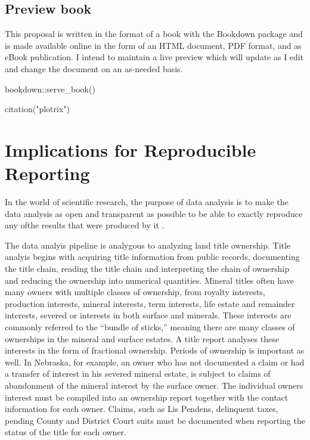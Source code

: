 \documentclass[
]{book}
\newenvironment{Shaded}{\begin{snugshade}}{\end{snugshade}}
\newcommand{\FunctionTok}[1]{\textcolor[rgb]{0.00,0.00,0.00}{#1}}
\newcommand{\NormalTok}[1]{#1}
\newcommand{\SpecialCharTok}[1]{\textcolor[rgb]{0.00,0.00,0.00}{#1}}
\newcommand{\StringTok}[1]{\textcolor[rgb]{0.31,0.60,0.02}{#1}}
\theoremstyle{definition}
\theoremstyle{definition}
\theoremstyle{definition}
\theoremstyle{definition}
\theoremstyle{remark}
\begin{document}
\hypertarget{preview-book}{%
\section{Preview book}\label{preview-book}}

This proposal is written in the format of a book with the Bookdown package and is made available online in the form of an HTML document, PDF format, and as eBook publication. I intend to maintain a live preview which will update as I edit and change the document on an as-needed basis.

\begin{Shaded}
\begin{Highlighting}[]
\NormalTok{bookdown}\SpecialCharTok{::}\FunctionTok{serve\_book}\NormalTok{()}
\end{Highlighting}
\end{Shaded}

\begin{Shaded}
\begin{Highlighting}[]
\FunctionTok{citation}\NormalTok{(}\StringTok{"plotrix"}\NormalTok{)}
\end{Highlighting}
\end{Shaded}

\hypertarget{implications-for-reproducible-reporting}{%
\chapter{Implications for Reproducible Reporting}\label{implications-for-reproducible-reporting}}

In the world of scientific research, the purpose of data analysis is to make the data analysis as open and transparent as possible to be able to exactly reproduce any ofthe results that were produced by it \citep{andrewsChapterReproducibleData}.

The data analyis pipeline is analygous to analyzing land title ownership. Title analyis begins with acquiring title information from public records, documenting the title chain, reading the title chain and interpreting the chain of ownership and reducing the ownership into numerical quantities. Mineral titles often have many owners with multiple classes of ownership, from royalty interests, production interests, mineral interests, term interests, life estate and remainder interests, severed or interests in both surface and minerals. These interests are commonly referred to the ``bundle of sticks,'' meaning there are many classes of ownerships in the mineral and surface estates. A title report analyses these interests in the form of fractional ownership. Periods of ownership is important as well. In Nebraska, for example, an owner who has not documented a claim or had a transfer of interest in his severed mineral estate, is subject to claims of abandonment of the mineral interest by the surface owner. The individual owners interest must be compiled into an ownership report together with the contact information for each owner. Claims, such as Lis Pendens, delinquent taxes, pending County and District Court suits must be documented when reporting the status of the title for each owner.
\end{document}
